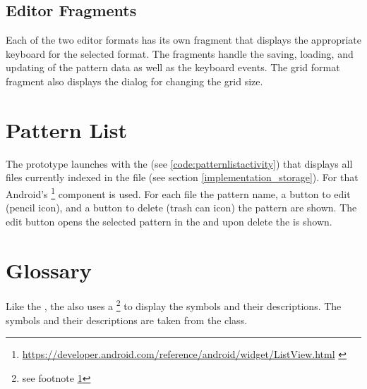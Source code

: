 \subsection*{Editor Fragments}
Each of the two editor formats has its own fragment that displays the appropriate keyboard for the selected format. The fragments handle the saving, loading, and updating of the pattern data as well as the keyboard events. The grid format fragment also displays the dialog for changing the grid size.

\section{Pattern List}
The prototype launches with the  (see \ref{code:patternlistactivity}) that displays all files currently indexed in the  file (see section \ref{implementation_storage}). For that Android's \footnote{\url{https://developer.android.com/reference/android/widget/ListView.html} \label{url_footnote}} component is used. For each file the pattern name, a button to edit (pencil icon), and a button to delete (trash can icon) the pattern are shown. The edit button opens the selected pattern in the  and upon delete the  is shown.

\section{Glossary}
Like the , the  also uses a \footnote{see footnote \ref{url_footnote}} to display the symbols and their descriptions. The symbols and their descriptions are taken from the  class.

